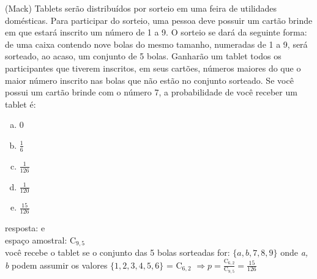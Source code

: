 \begin{ex}
 (Mack) Tablets serão distribuídos por sorteio em uma feira de utilidades domésticas. Para participar do sorteio, uma pessoa deve possuir um cartão brinde em que estará inscrito um número de 1 a 9. O sorteio se dará da seguinte forma: de uma caixa contendo nove bolas do mesmo tamanho, numeradas de 1 a 9, será sorteado, ao acaso, um conjunto de 5 bolas. Ganharão um tablet todos os participantes que tiverem inscritos, em seus cartões, números maiores do que o maior número inscrito nas bolas que não estão no conjunto sorteado. Se você possui um cartão brinde com o número 7, a probabilidade de você receber um tablet é:
   \begin{enumerate}   [(a)]
       \item 0
       \item $\frac{1}{6}$
       \item $\frac{1}{126}$
       \item $\frac{1}{120}$
       \item $\frac{15}{126}$
   \end{enumerate}
     \begin{sol}
      resposta: e \\
      espaço amostral: $\mathrm{C}_{9,5}$ \\
      você recebe o tablet se o conjunto das 5 bolas sorteadas for: $\{a, b, 7, 8, 9\}$ onde \textit{a, b} podem assumir os valores $\{1, 2, 3, 4, 5, 6\}$ =  $ \mathrm{C}_{6,2}$
      $\Longrightarrow p= \frac{\mathrm{C}_{6,2}}{\mathrm{C}_{9,5}}=\frac{15}{126}$
     \end{sol}
 \end{ex}